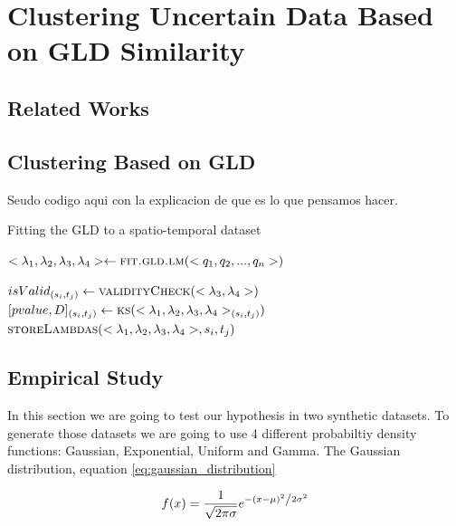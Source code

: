 \chapter[Clustering Uncertain Data Based on GLD Similarity]{Clustering Uncertain Data Based on GLD Similarity}\label{cap:gld_clustering}

\section{Related Works}

\cite{Jiang2011}

\section{Clustering Based on GLD}

Seudo codigo aqui con la explicacion de que es lo que pensamos hacer.

\begin{algorithm} 
\caption{Fitting the GLD to a spatio-temporal dataset}\label{alg:fitGLD}
\begin{algorithmic}[1] 
\State $<\lambda_{1},\lambda_{2},\lambda_{3},\lambda_{4}> \gets \Call {fit.gld.lm}{<q_1,q_2,...,q_n>}$

\State $isValid_{(s_{i},t_{j})} \gets \Call {validityCheck}{<\lambda_{3},\lambda_{4}>}$
\State $[pvalue,D]_{(s_{i},t_{j})} \gets \Call{ks}{<\lambda_{1},\lambda_{2},\lambda_{3},\lambda_{4}>_{(s_{i},t_{j})}}$
\EndIf
{}
\State $\Call{storeLambdas}{<\lambda_{1},\lambda_{2},\lambda_{3},\lambda_{4}>,s_{i},t_{j}}$
\EndIf
\EndFunction 
\end{algorithmic} 
\end{algorithm} 

\section{Empirical Study}

In this section we are going to test our hypothesis in two synthetic datasets. To generate those datasets we are going to use 4 different probabiltiy density functions: Gaussian, Exponential, Uniform and Gamma. The Gaussian distribution, equation \ref{eq:gaussian_distribution}

\begin{equation}\label{eq:gaussian_distribution}
f(x) = \frac{1}{{ \sqrt {2\pi \sigma} }}e^{{{ - \left( {x - \mu } \right)^2 } \mathord{\left/ {\vphantom {{ - \left( {x - \mu } \right)^2 } {2\sigma ^2 }}} \right. \kern-\nulldelimiterspace} {2\sigma ^2 }}}
\end{equation}

